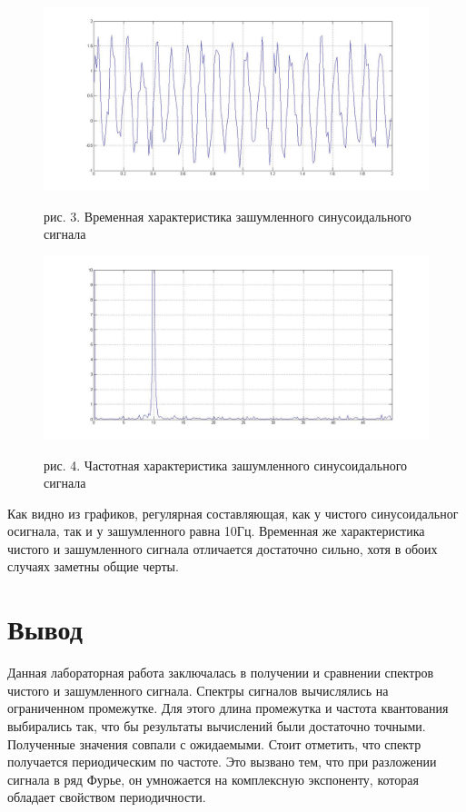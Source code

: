 \documentclass[10pt,a4paper]{report}
\begin{document}
\begin{figure}
\begin{center}
\includegraphics[angle=0, scale = 0.3]{nsint.jpg}
\end{center}
рис. 3. Временная характеристика зашумленного синусоидального сигнала
\begin{center}
\includegraphics[angle=0, scale = 0.3]{nsinch.jpg}
\end{center}
рис. 4. Частотная характеристика зашумленного синусоидального сигнала
\end{figure}
Как видно из графиков, регулярная составляющая, как у чистого синусоидальног осигнала, так и у зашумленного равна 10Гц. Временная же характеристика чистого и зашумленного сигнала отличается достаточно сильно, хотя в обоих случаях заметны общие черты.
\section{Вывод}
Данная лабораторная работа заключалась в получении и сравнении спектров чистого и зашумленного сигнала. Спектры сигналов вычислялись на ограниченном промежутке. Для этого длина промежутка и частота квантования выбирались так, что бы результаты вычислений были достаточно точными. Полученные значения совпали с ожидаемыми. Стоит отметить, что спектр получается периодическим по частоте. Это вызвано тем, что при разложении сигнала в ряд Фурье, он умножается на комплексную экспоненту, которая обладает свойством периодичности.
\end{document}
